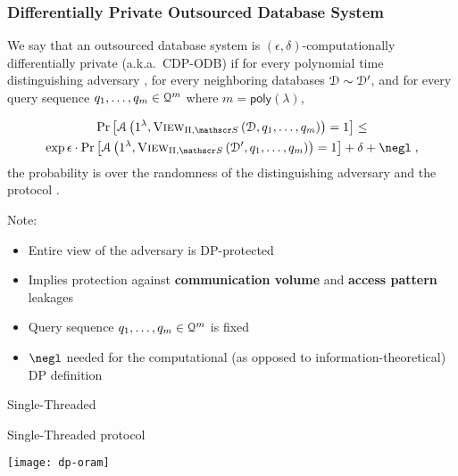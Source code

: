 	\begin{frame}[label={frame:epsolute-cdp-odb}]

		\frametitle{Differentially Private Outsourced Database System}

		\begin{definition}
			\justify%

			We say that an outsourced database system \protocol{} is $(\epsilon, \delta)$-computationally differentially private (a.k.a.~CDP-ODB) if for every polynomial time distinguishing adversary \adversary{}, for every neighboring databases $\mathcal{D} \sim \mathcal{D}^\prime$, and for every query sequence $\fromNtoM{\query}{1}{m} \in \querySet^m$ where $m = \mathsf{poly}(\lambda)$,

			\begin{multline*}
				\probability{\adversary \left( 1^\lambda, \view{\protocol, \server}{\database, \fromNtoM{\query}{1}{m}} \right) = 1 } \leq \\
				\exp{\epsilon} \cdot \probability{\adversary \left( 1^\lambda, \view{\protocol ,\server}{\database^\prime, \fromNtoM{\query}{1}{m}} \right) = 1} + \delta + \negl \; ,
			\end{multline*}
			the probability is over the randomness of the distinguishing adversary \adversary{} and the protocol \protocol{}.
		\end{definition}

		\pause%

		Note:
		\begin{itemize}
			\item Entire view of the adversary is DP-protected
			\item Implies protection against \textbf{communication volume} and \textbf{access pattern} leakages
			\item Query sequence $\fromNtoM{\query}{1}{m} \in \querySet^m$ is fixed \hyperlink{frame:appendix:cdp-odb-adaptive}{}
			\item $\negl$ needed for the computational (as opposed to information-theoretical) DP definition
		\end{itemize}

	\end{frame}

	\begin{frame}{Single-Threaded \epsolute{}}

		\begin{block}{Single-Threaded \epsolute{} protocol}

			\vspace*{2ex}
			\centering
			\texttt{[image: dp-oram]}

		\end{block}

	\end{frame}

